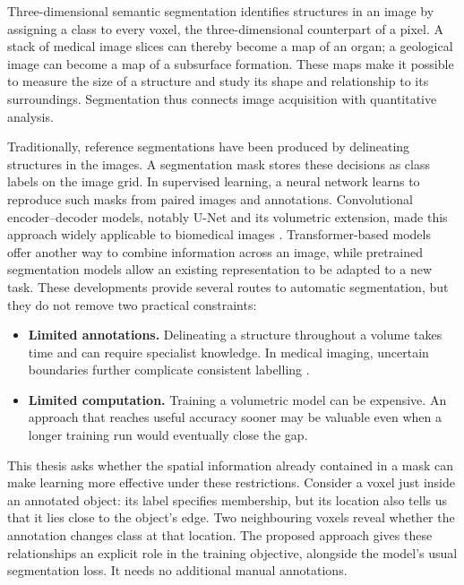 \documentclass[12pt,a4paper]{article}
\begin{document}
Three-dimensional semantic segmentation identifies structures in an image
by assigning a class to every voxel, the three-dimensional counterpart
of a pixel. A stack of medical image slices can thereby become a map of
an organ; a geological image can become a map of a subsurface formation.
These maps make it possible to measure the size of a structure and study
its shape and relationship to its surroundings. Segmentation thus connects
image acquisition with quantitative analysis.

Traditionally, reference segmentations have been produced by delineating
structures in the images. A segmentation mask stores these decisions as
class labels on the image grid. In supervised learning, a neural network
learns to reproduce such masks from paired images and annotations.
Convolutional encoder--decoder models, notably U-Net and its volumetric
extension, made this approach widely applicable to biomedical images
\cite{ronneberger2015unet,cicek2016unet}. Transformer-based models offer
another way to combine information across an image, while pretrained
segmentation models allow an existing representation to be adapted to a
new task. These developments provide several routes to automatic
segmentation, but they do not remove two practical constraints:
\begin{itemize}
\item \textbf{Limited annotations.} Delineating a structure throughout a
volume takes time and can require specialist knowledge. In medical
imaging, uncertain boundaries further complicate consistent labelling
\cite{wang2021annotation}.
\item \textbf{Limited computation.} Training a volumetric model can be
expensive. An approach that reaches useful accuracy sooner may be
valuable even when a longer training run would eventually close the gap.
\end{itemize}

This thesis asks whether the spatial information already contained in a
mask can make learning more effective under these restrictions. Consider
a voxel just inside an annotated object: its label specifies membership,
but its location also tells us that it lies close to the object's edge.
Two neighbouring voxels reveal whether the annotation changes class at
that location. The proposed approach gives these relationships an explicit
role in the training objective, alongside the model's usual segmentation
loss. It needs no additional manual annotations.
\end{document}
